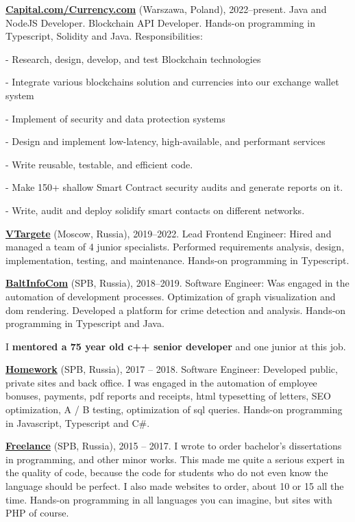 \documentclass{yb}
\begin{document}
\href{https://currency.com/}{\textbf{Capital.com/Currency.com}} (Warszawa, Poland), 2022--present.
Java and NodeJS Developer. Blockchain API Developer.
Hands-on programming in Typescript, Solidity and Java.
Responsibilities:

- Research, design, develop, and test Blockchain technologies

- Integrate various blockchains solution and currencies into our exchange wallet system

- Implement of security and data protection systems

- Design and implement low-latency, high-available, and performant services

- Write reusable, testable, and efficient code.

- Make 150+ shallow Smart Contract security audits and generate reports on it.

- Write, audit and deploy solidify smart contacts on different networks.


\href{https://vtargete.ru/}{\textbf{VTargete}} (Moscow, Russia), 2019--2022.
Lead Frontend Engineer: 
Hired and managed a team of 4 junior specialists.
Performed requirements analysis, design, implementation, testing, and maintenance.
Hands-on programming in Typescript.

\textbf{\href{https://baltinfocom.ru/BigData\#en}{BaltInfoCom}} (SPB, Russia), 2018--2019.
Software Engineer:
Was engaged in the automation of development processes. Optimization of graph visualization and dom rendering. Developed a platform for crime detection and analysis.
Hands-on programming in Typescript and Java.

I \textbf{mentored a 75 year old c++ senior developer} and one junior at this job.

\textbf{\href{https://homework.ru}{Homework}} (SPB, Russia), 2017 -- 2018.
Software Engineer:
Developed public, private sites and back office. I was engaged in the automation of employee bonuses, payments, pdf reports and receipts, html typesetting of letters, SEO optimization, A / B testing, optimization of sql queries.
Hands-on programming in Javascript, Typescript and C\#.

\textbf{\href{https://www.upwork.com/}{Freelance}} (SPB, Russia), 2015 -- 2017.
I wrote to order bachelor's dissertations in programming, and other minor works. This made me quite a serious expert in the quality of code, because the code for students who do not even know the language should be perfect. I also made websites to order, about 10 or 15 all the time. 
Hands-on programming in all languages you can imagine, but sites with PHP of course.
\end{document}
